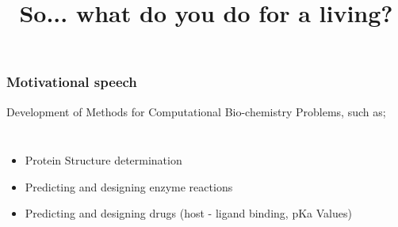

\usepackage{soul}

\title[]{So... what do you do for a living?}








{
\usebackgroundtemplate{}
\begin{frame}[plain]
    \titlepage
    \addtocounter{framenumber}{-1}
\end{frame}
}

{


\begin{frame}[fragile]

    \frametitle{Motivational speech}

    Development of Methods for Computational Bio-chemistry Problems,
    such as;

    \bigskip

    \begin{columns}[c]

    \begin{itemize}
        \item Protein Structure determination
        \item Predicting and designing enzyme reactions
        \item Predicting and designing drugs \newpage
            {\scriptsize (host - ligand binding, pKa Values) }
    \end{itemize}

    \end{columns}

\end{frame}
}



